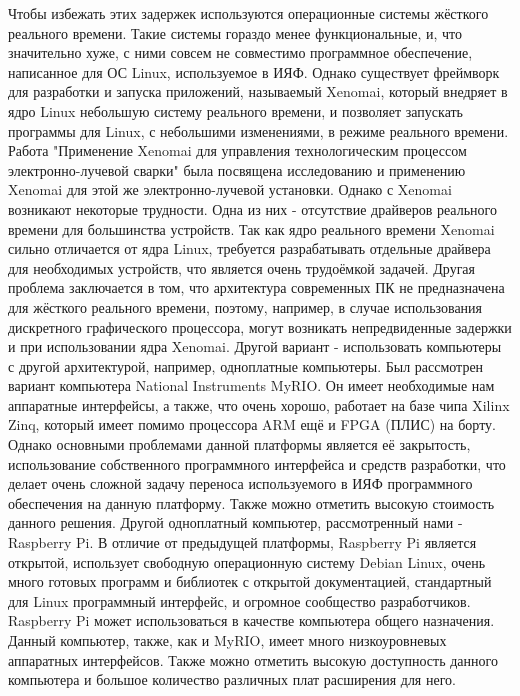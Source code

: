 \documentclass[14pt,russian,a4paper]{extarticle}
\begin{document}
Чтобы избежать этих задержек используются операционные системы жёсткого реального времени. Такие системы гораздо менее функциональные, и, что значительно хуже, с ними совсем не совместимо программное обеспечение, написанное для ОС Linux, используемое в ИЯФ. Однако существует фреймворк для разработки и запуска приложений, называемый Xenomai\cite{xenomai}, который внедряет в ядро Linux небольшую систему реального времени, и позволяет запускать программы для Linux, с небольшими изменениями, в режиме реального времени. Работа "Применение Xenomai для управления технологическим процессом электронно-лучевой сварки" \cite{xeno_weld} была посвящена исследованию и применению Xenomai для этой же электронно-лучевой установки. Однако с Xenomai возникают некоторые трудности. Одна из них - отсутствие драйверов реального времени для большинства устройств. Так как ядро реального времени Xenomai сильно отличается от ядра Linux, требуется разрабатывать отдельные драйвера для необходимых устройств, что является очень трудоёмкой задачей. Другая проблема заключается в том, что архитектура современных ПК не предназначена для жёсткого реального времени, поэтому, например, в случае использования дискретного графического процессора, могут возникать непредвиденные задержки и при использовании ядра Xenomai.
\newline
Другой вариант - использовать компьютеры с другой архитектурой, например, одноплатные компьютеры. Был рассмотрен вариант компьютера National Instruments MyRIO\cite{myrio}. Он имеет необходимые нам аппаратные интерфейсы, а также, что очень хорошо, работает на базе чипа Xilinx Zinq, который имеет помимо процессора ARM ещё и FPGA (ПЛИС) на борту. Однако основными проблемами данной платформы является её закрытость, использование собственного программного интерфейса и средств разработки, что делает очень сложной задачу переноса используемого в ИЯФ программного обеспечения на данную платформу. Также можно отметить высокую стоимость данного решения.
\newline
Другой одноплатный компьютер, рассмотренный нами - Raspberry Pi\cite{raspberry_pi}. В отличие от предыдущей платформы, Raspberry Pi является открытой, использует свободную операционную систему Debian Linux, очень много готовых программ и библиотек с открытой документацией, стандартный для Linux программный интерфейс, и огромное сообщество разработчиков. Raspberry Pi может использоваться в качестве компьютера общего назначения. Данный компьютер, также, как и MyRIO, имеет много низкоуровневых аппаратных интерфейсов. Также можно отметить высокую доступность данного компьютера и большое количество различных плат расширения для него.
\end{document}
